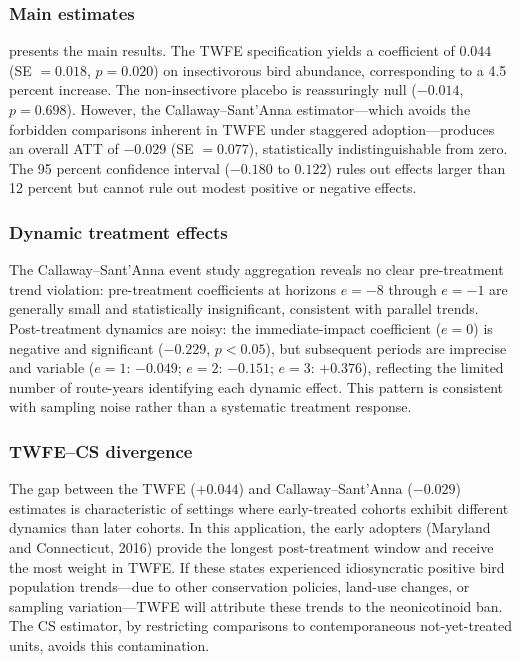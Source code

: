 \documentclass[12pt]{article}
\begin{document}
\subsubsection*{Main estimates}  presents the main results. The TWFE specification yields a coefficient of $0.044$ (SE $= 0.018$, $p = 0.020$) on insectivorous bird abundance, corresponding to a 4.5 percent increase. The non-insectivore placebo is reassuringly null ($-0.014$, $p = 0.698$). However, the Callaway--Sant'Anna estimator---which avoids the forbidden comparisons inherent in TWFE under staggered adoption---produces an overall ATT of $-0.029$ (SE $= 0.077$), statistically indistinguishable from zero. The 95 percent confidence interval ($-0.180$ to $0.122$) rules out effects larger than 12 percent but cannot rule out modest positive or negative effects.

\subsubsection*{Dynamic treatment effects} The Callaway--Sant'Anna event study aggregation reveals no clear pre-treatment trend violation: pre-treatment coefficients at horizons $e = -8$ through $e = -1$ are generally small and statistically insignificant, consistent with parallel trends. Post-treatment dynamics are noisy: the immediate-impact coefficient ($e = 0$) is negative and significant ($-0.229$, $p < 0.05$), but subsequent periods are imprecise and variable ($e = 1$: $-0.049$; $e = 2$: $-0.151$; $e = 3$: $+0.376$), reflecting the limited number of route-years identifying each dynamic effect. This pattern is consistent with sampling noise rather than a systematic treatment response.

\subsubsection*{TWFE--CS divergence} The gap between the TWFE ($+0.044$) and Callaway--Sant'Anna ($-0.029$) estimates is characteristic of settings where early-treated cohorts exhibit different dynamics than later cohorts. In this application, the early adopters (Maryland and Connecticut, 2016) provide the longest post-treatment window and receive the most weight in TWFE. If these states experienced idiosyncratic positive bird population trends---due to other conservation policies, land-use changes, or sampling variation---TWFE will attribute these trends to the neonicotinoid ban. The CS estimator, by restricting comparisons to contemporaneous not-yet-treated units, avoids this contamination.
\end{document}
